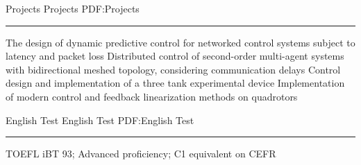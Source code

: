 \documentclass[letterpaper,MMMyyyy]{CVTemplate}
\begin{document}
\begin{Body}
\Gap
\endgroup




\Section
{Projects}
{Projects}
{PDF:Projects}
\textcolor{Forestg}{\vspace{0.10cm}\hrule height 0.1cm}\BigGap\Gap
\vspace{6pt}
\BulletItem
The design of dynamic predictive control for networked control systems subject to latency and packet loss
\vspace{6pt}
\BulletItem
Distributed control of second-order multi-agent systems with bidirectional meshed topology, considering communication delays
\vspace{6pt}
\BulletItem
Control design and implementation of a three tank experimental device
\vspace{6pt}
\BulletItem
Implementation of modern control and feedback linearization methods on quadrotors

\Section
{English Test}
{English Test}
{PDF:English Test}
\textcolor{Forestg}{\vspace{0.10cm}\hrule height 0.1cm}\BigGap\Gap
\BulletItem
TOEFL iBT 93; Advanced proficiency; C1 equivalent on CEFR



\end{Body}
\end{document}
